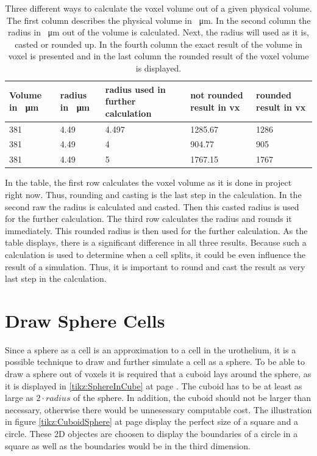 \begin{table}[h]
\centering
\caption{Three different ways to calculate the voxel volume out of a given physical volume. The first column describes the physical volume in \SI{}{\micro\metre}. In the second column the radius in \SI{}{\micro\metre} out of the volume is calculated. Next, the radius will used as it is, casted or rounded up. In the fourth column the exact result of the volume in voxel is presented and in the last column the rounded result of the voxel volume is displayed.}
\renewcommand{\arraystretch}{1.5}
	\begin{tabularx}{\textwidth}{X||X||X||X||X}
		Volume in \SI{}{\micro\metre} & radius in \SI{}{\micro\metre} & radius used in further calculation & not rounded result in vx & rounded result in vx  \\
		\hline
		381 & 4.49 & 4.497 & 1285.67 & 1286 \\
		
		381 & 4.49 & 4 & 904.77 & 905\\
		
		381 & 4.49 & 5 & 1767.15 & 1767\\

	\end{tabularx}
	\label{tbl:Approximation error}
\end{table}

In the table, the first row calculates the voxel volume as it is done in project right now. Thus, rounding and casting is the last step in the calculation. In the second raw the radius is calculated and casted. Then this casted radius is used for the further calculation. The third row calculates the radius and rounds it immediately. This rounded radius is then used for the further calculation. \newline
As the table displays, there is a significant difference in all three results. Because such a calculation is used to determine when a cell splits, it could be even influence the result of a simulation. Thus, it is important to round and cast the result as very last step in the calculation.




\section{Draw Sphere Cells}
Since a sphere as a cell is an approximation to a cell in the urothelium, it is a possible technique to draw and further simulate a cell as a sphere. \newline 
To be able to draw a sphere out of voxels it is required that a cuboid lays around the sphere, as it is displayed in \ref{tikz:SphereInCube} at page \pageref{tikz:SphereInCube}. The cuboid has to be at least as large as $2 \cdot radius$ of the sphere. In addition, the cuboid should not be larger than necessary, otherwise there would be unnesessary computable cost. The illustration in figure \ref{tikz:CuboidSphere} at page \pageref{tikz:CuboidSphere} display the perfect size of a square and a circle. These 2D objectes are choosen to display the boundaries of a circle in a square as well as the boundaries would be in the third dimension.


